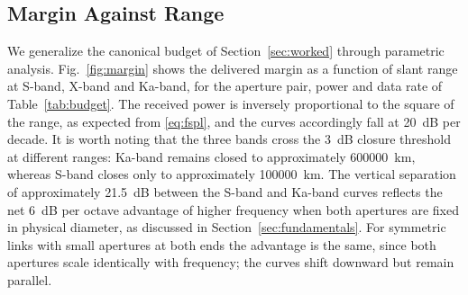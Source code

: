 \documentclass[11pt,a4paper]{article}
\begin{document}
\subsection{Margin Against Range}
We generalize the canonical budget of Section~\ref{sec:worked} through parametric analysis. Fig.~\ref{fig:margin} shows the delivered margin as a function of slant range at S-band, X-band and Ka-band, for the aperture pair, power and data rate of Table~\ref{tab:budget}. The received power is inversely proportional to the square of the range, as expected from \eqref{eq:fspl}, and the curves accordingly fall at \SI{20}{dB} per decade. It is worth noting that the three bands cross the \SI{3}{dB} closure threshold at different ranges: Ka-band remains closed to approximately \SI{600000}{km}, whereas S-band closes only to approximately \SI{100000}{km}. The vertical separation of approximately \SI{21.5}{dB} between the S-band and Ka-band curves reflects the net \SI{6}{dB} per octave advantage of higher frequency when both apertures are fixed in physical diameter, as discussed in Section~\ref{sec:fundamentals}. For symmetric links with small apertures at both ends the advantage is the same, since both apertures scale identically with frequency; the curves shift downward but remain parallel.
\end{document}
